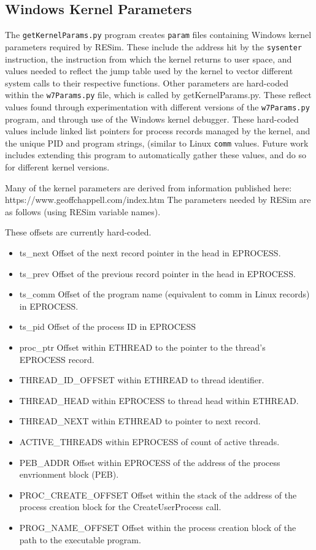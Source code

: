 \documentclass[titlepage]{article}
\begin{document}
\begin{appendices}
\subsection{Windows Kernel Parameters}
The {\tt getKernelParams.py} program creates {\tt param} files containing Windows kernel parameters required by RESim.  These include the address hit by the {\tt sysenter} instruction, 
the instruction from which the kernel returns to user space, and values needed to reflect the jump table used by the kernel to vector different system calls to their respective
functions.  Other parameters are hard-coded within the {\tt w7Params.py} file, which is called by getKernelParams.py.  These reflect values found through experimentation with different versions of the {\tt w7Params.py} program,
and through use of the Windows kernel debugger. These hard-coded values include linked list pointers for process records managed by the kernel, 
and the unique PID and program strings, (similar to Linux {\tt comm} values.  Future work includes extending this program to automatically gather these values, and do so for different 
kernel versions.

Many of the kernel parameters are derived from information published here:  https://www.geoffchappell.com/index.htm
The parameters needed by RESim are as follows (using RESim variable names).

These offsets are currently hard-coded.
\begin{itemize}
\item ts\_next Offset of the next record pointer in the head in EPROCESS.
\item ts\_prev Offset of the previous record pointer in the head in EPROCESS.
\item ts\_comm Offset of the program name (equivalent to comm in Linux records) in EPROCESS.
\item ts\_pid Offset of the process ID in EPROCESS
\item proc\_ptr Offset within ETHREAD to the pointer to the thread's EPROCESS record.
\item THREAD\_ID\_OFFSET within ETHREAD to thread identifier.
\item THREAD\_HEAD within EPROCESS to thread head within ETHREAD.
\item THREAD\_NEXT within ETHREAD to pointer to next record.
\item ACTIVE\_THREADS within EPROCESS of count of active threads.
\item PEB\_ADDR Offset within EPROCESS of the address of the process envrionment block (PEB).
\item PROC\_CREATE\_OFFSET Offset within the stack of the address of the process creation block for the CreateUserProcess call.
\item PROG\_NAME\_OFFSET Offset within the process creation block of the path to the executable program.
\end{itemize}


\end{appendices}
\end{document}
